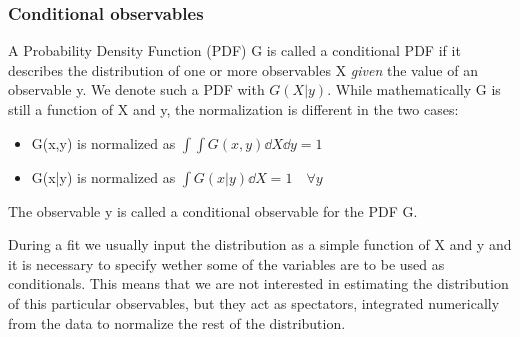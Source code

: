 \subsubsection{Conditional observables}
\label{subsubsec:cond_obs}

A Probability Density Function (PDF) G is called a conditional PDF if it describes the distribution of one or more observables X \textit{given} the value of an observable y.
We denote such a PDF with $G(X|y)$. 
While mathematically G is still a function of X and y, the normalization is different in the two cases:
\begin{itemize}
	\item G(x,y) is normalized as $\int\int G(x,y)\dd{X}\dd{y} = 1$
	\item G(x|y) is normalized as $\int G(x|y)\dd{X} = 1 \quad \forall y$
\end{itemize}
The observable y is called a conditional observable for the PDF G.

During a fit we usually input the distribution as a simple function of X and y and it is necessary to specify wether some of the variables are to be used as conditionals.
This means that we are not interested in estimating the distribution of this particular observables, but they act as spectators, integrated numerically from the data to normalize the rest of the distribution.

